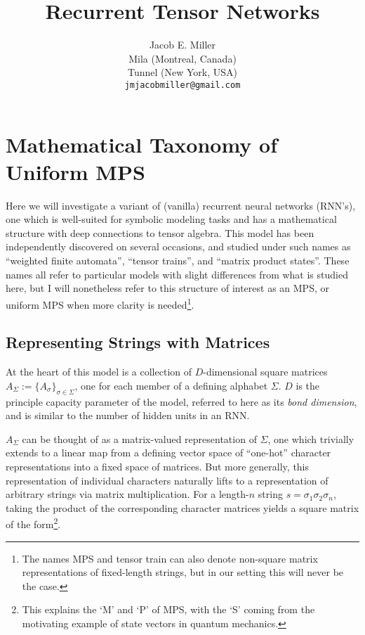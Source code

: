 \documentclass{article}
\title{Recurrent Tensor Networks}
\author{
  Jacob E. Miller \\
  Mila (Montreal, Canada) \\
  Tunnel (New York, USA) \\
  \texttt{jmjacobmiller@gmail.com} \\
}
\begin{document}
\maketitle


\section{Mathematical Taxonomy of Uniform MPS}

Here we will investigate a variant of (vanilla) recurrent neural networks (RNN's), one which is well-suited for symbolic modeling tasks and has a mathematical structure with deep connections to tensor algebra. This model has been independently discovered on several occasions, and studied under such names as ``weighted finite automata'', ``tensor trains'', and ``matrix product states''. These names all refer to particular models with slight differences from what is studied here, but I will nonetheless refer to this structure of interest as an MPS, or uniform MPS when more clarity is needed\footnote{The names MPS and tensor train can also denote non-square matrix representations of fixed-length strings, but in our setting this will never be the case.}.

\subsection{Representing Strings with Matrices}
At the heart of this model is a collection of $D$-dimensional square matrices $A_{\Sigma} := \{A_\sigma\}_{\sigma \in \Sigma}$, one for each member of a defining alphabet $\Sigma$. $D$ is the principle capacity parameter of the model, referred to here as its \textit{bond dimension}, and is similar to the number of hidden units in an RNN.

$A_\Sigma$ can be thought of as a matrix-valued representation of $\Sigma$, one which trivially extends to a linear map from a defining vector space of ``one-hot'' character representations into a fixed space of matrices. But more generally, this representation of individual characters naturally lifts to a representation of arbitrary strings via matrix multiplication. For a length-$n$ string $s = \sigma_1 \sigma_2 \sigma_n$, taking the product of the corresponding character matrices yields a square matrix of the form\footnote{This explains the `M' and `P' of MPS, with the `S' coming from the motivating example of state vectors in quantum mechanics.}.
\end{document}
